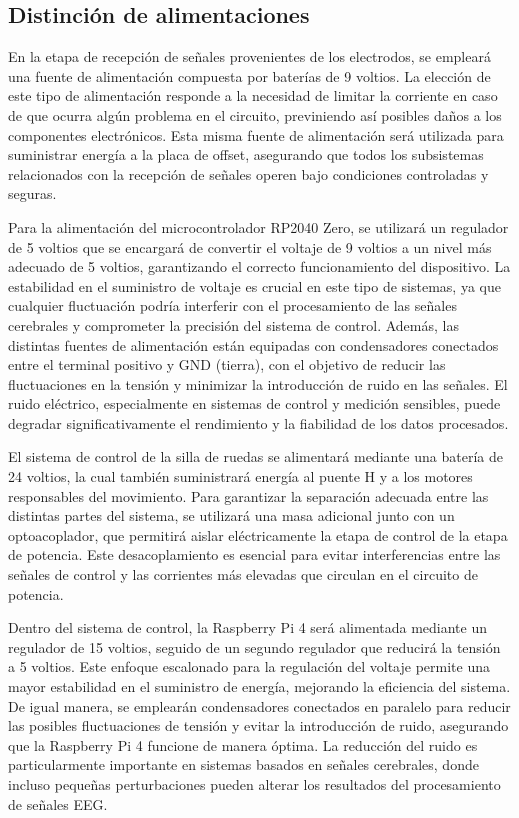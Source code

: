 \documentclass{article}
\begin{document}
\subsection{Distinción de alimentaciones}

En la etapa de recepción de señales provenientes de los electrodos, se empleará una fuente de alimentación compuesta por baterías de 9 voltios. La elección de este tipo de alimentación responde a la necesidad de limitar la corriente en caso de que ocurra algún problema en el circuito, previniendo así posibles daños a los componentes electrónicos. Esta misma fuente de alimentación será utilizada para suministrar energía a la placa de offset, asegurando que todos los subsistemas relacionados con la recepción de señales operen bajo condiciones controladas y seguras.

Para la alimentación del microcontrolador RP2040 Zero, se utilizará un regulador de 5 voltios que se encargará de convertir el voltaje de 9 voltios a un nivel más adecuado de 5 voltios, garantizando el correcto funcionamiento del dispositivo. La estabilidad en el suministro de voltaje es crucial en este tipo de sistemas, ya que cualquier fluctuación podría interferir con el procesamiento de las señales cerebrales y comprometer la precisión del sistema de control. Además, las distintas fuentes de alimentación están equipadas con condensadores conectados entre el terminal positivo y GND (tierra), con el objetivo de reducir las fluctuaciones en la tensión y minimizar la introducción de ruido en las señales. El ruido eléctrico, especialmente en sistemas de control y medición sensibles, puede degradar significativamente el rendimiento y la fiabilidad de los datos procesados.

El sistema de control de la silla de ruedas se alimentará mediante una batería de 24 voltios, la cual también suministrará energía al puente H y a los motores responsables del movimiento. Para garantizar la separación adecuada entre las distintas partes del sistema, se utilizará una masa adicional junto con un optoacoplador, que permitirá aislar eléctricamente la etapa de control de la etapa de potencia. Este desacoplamiento es esencial para evitar interferencias entre las señales de control y las corrientes más elevadas que circulan en el circuito de potencia.

Dentro del sistema de control, la Raspberry Pi 4 será alimentada mediante un regulador de 15 voltios, seguido de un segundo regulador que reducirá la tensión a 5 voltios. Este enfoque escalonado para la regulación del voltaje permite una mayor estabilidad en el suministro de energía, mejorando la eficiencia del sistema. De igual manera, se emplearán condensadores conectados en paralelo para reducir las posibles fluctuaciones de tensión y evitar la introducción de ruido, asegurando que la Raspberry Pi 4 funcione de manera óptima. La reducción del ruido es particularmente importante en sistemas basados en señales cerebrales, donde incluso pequeñas perturbaciones pueden alterar los resultados del procesamiento de señales EEG.
\end{document}
